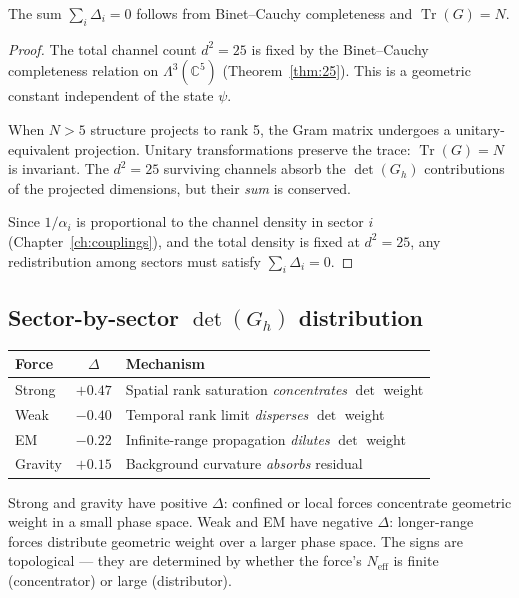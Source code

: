 \begin{theorem}
The sum $\sum_i \Delta_i = 0$ follows from Binet--Cauchy completeness and $\operatorname{Tr}(G) = N$.
\end{theorem}

\begin{proof}
The total channel count $d^2 = 25$ is fixed by the Binet--Cauchy completeness relation on $\Lambda^3(\mathbb{C}^5)$ (Theorem~\ref{thm:25}). This is a geometric constant independent of the state $\psi$.

When $N > 5$ structure projects to rank 5, the Gram matrix undergoes a unitary-equivalent projection. Unitary transformations preserve the trace: $\operatorname{Tr}(G) = N$ is invariant. The $d^2 = 25$ surviving channels absorb the $\det(G_h)$ contributions of the projected dimensions, but their \emph{sum} is conserved.

Since $1/\alpha_i$ is proportional to the channel density in sector $i$ (Chapter~\ref{ch:couplings}), and the total density is fixed at $d^2 = 25$, any redistribution among sectors must satisfy $\sum_i \Delta_i = 0$.
\end{proof}

\subsection{Sector-by-sector $\det(G_h)$ distribution}

\begin{center}
\begin{tabular}{lcl}
\hline
Force & $\Delta$ & Mechanism \\
\hline
Strong & $+0.47$ & Spatial rank saturation \emph{concentrates} $\det$ weight \\
Weak & $-0.40$ & Temporal rank limit \emph{disperses} $\det$ weight \\
EM & $-0.22$ & Infinite-range propagation \emph{dilutes} $\det$ weight \\
Gravity & $+0.15$ & Background curvature \emph{absorbs} residual \\
\hline
\end{tabular}
\end{center}

Strong and gravity have positive $\Delta$: confined or local forces concentrate geometric weight in a small phase space. Weak and EM have negative $\Delta$: longer-range forces distribute geometric weight over a larger phase space. The signs are topological --- they are determined by whether the force's $N_\text{eff}$ is finite (concentrator) or large (distributor).

